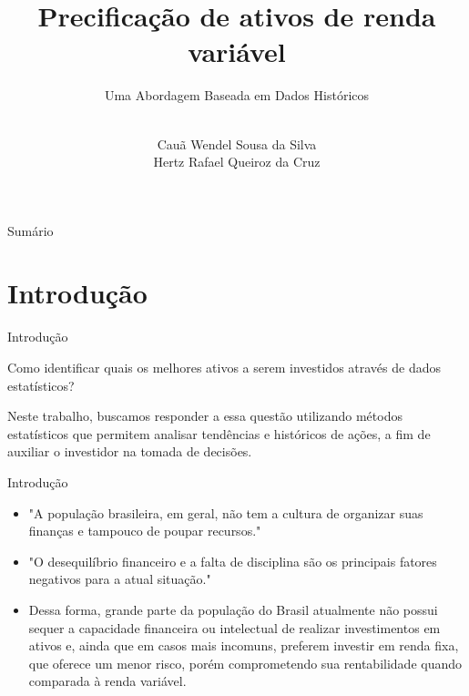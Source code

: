 \documentclass[aspectratio=169]{beamer}
\title{Precificação de ativos de renda variável}
\subtitle{Uma Abordagem Baseada em Dados Históricos}
\author{\\Cauã Wendel Sousa da Silva \\ Hertz Rafael Queiroz da Cruz}
\begin{document}
\begin{frame}
  \maketitle
\end{frame}


\begin{frame}{Sumário}
  \tableofcontents
\end{frame}

\section{Introdução}
\begin{frame}{Introdução}

  \begin{center}
    {\Large Como identificar quais os melhores ativos a serem investidos através de dados estatísticos?}

    
  \end{center}

  \vspace{0.5cm}
Neste trabalho, buscamos responder a essa questão utilizando métodos estatísticos que permitem analisar tendências e históricos de ações, a fim de auxiliar o investidor na tomada de decisões.


  
\end{frame}

\begin{frame}{Introdução}

  \begin{itemize}
    \item "A população brasileira, em geral, não tem a cultura de organizar suas finanças e tampouco de poupar recursos." \cite{Mendes2015}
    \item "O desequilíbrio financeiro e a falta de disciplina são os principais fatores negativos para a atual situação." \cite{Mendes2015}
    \item Dessa forma, grande parte da população do Brasil atualmente não possui sequer a capacidade financeira ou intelectual de realizar investimentos em ativos e, ainda que em casos mais incomuns, preferem investir em renda fixa, que oferece um menor risco, porém comprometendo sua rentabilidade quando comparada à renda variável.
  \end{itemize}
  
\end{frame}
\end{document}
